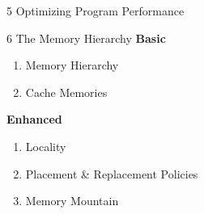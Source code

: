 \documentclass{beamer}
\begin{document}
\begin{frame}{5 Optimizing Program Performance}
	\only<1> {
	}
	 {
	}
\end{frame}


\begin{frame}{6 The Memory Hierarchy}
\textbf{Basic}
\begin{enumerate}
	\item Memory Hierarchy
	\item Cache Memories
\end{enumerate}
\textbf{Enhanced}
\begin{enumerate}
	\item Locality
	\item Placement \& Replacement Policies
	\item Memory Mountain
\end{enumerate}
\end{frame}
\end{document}
